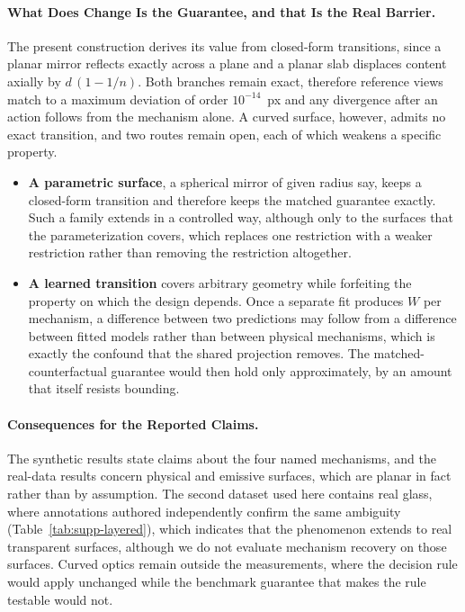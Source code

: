 \documentclass{article} %
\theoremstyle{defstyle}
\theoremstyle{plain}
\begin{document}
\paragraph{What Does Change Is the Guarantee, and that Is the Real Barrier.}
The present construction derives its value from closed-form transitions, since a planar
mirror reflects exactly across a plane and a planar slab displaces content axially by
$d\,(1 - 1/n)$. Both branches remain exact, therefore reference views match to a maximum
deviation of order $10^{-14}$~px and any divergence after an action follows from the
mechanism alone. A curved surface, however, admits no exact transition, and two routes remain open, each of
which weakens a specific property.

\begin{itemize}
\item \textbf{A parametric surface}, a spherical mirror of given radius say,
keeps a closed-form transition and therefore keeps the matched guarantee exactly. Such a
family extends in a controlled way, although only to the surfaces that the parameterization
covers, which replaces one restriction with a weaker restriction rather than removing the
restriction altogether.
\item \textbf{A learned transition} covers arbitrary geometry while forfeiting the property
on which the design depends. Once a separate fit produces $W$ per mechanism, a difference
between two predictions may follow from a difference between fitted models rather than
between physical mechanisms, which is exactly the confound that the shared projection
removes. The matched-counterfactual guarantee would then hold only approximately, by an
amount that itself resists bounding.
\end{itemize}

\paragraph{Consequences for the Reported Claims.}
The synthetic results state claims about the four named mechanisms, and the real-data
results concern physical and emissive surfaces, which are planar in fact rather than by
assumption. The second dataset used here contains real glass, where annotations authored
independently confirm the same ambiguity (Table~\ref{tab:supp-layered}), which indicates that
the phenomenon extends to real transparent surfaces, although we do not evaluate mechanism
recovery on those surfaces. Curved optics remain outside the measurements, where the decision
rule would apply unchanged while the benchmark guarantee that makes the rule testable would
not.
\end{document}
